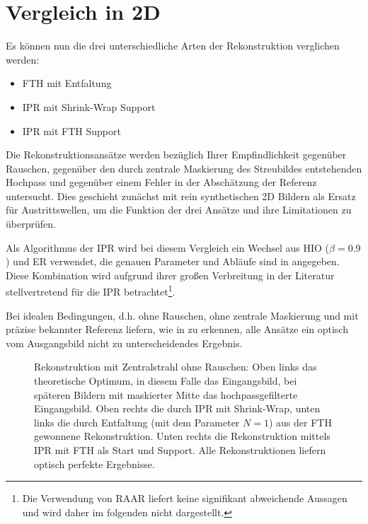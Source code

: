 \section{Vergleich in 2D}	
Es können nun die drei unterschiedliche Arten der Rekonstruktion verglichen werden:
\begin{itemize}
	\item FTH mit Entfaltung
	\item IPR mit Shrink-Wrap Support
	\item IPR mit FTH Support
\end{itemize}
Die Rekonstruktionsansätze werden bezüglich Ihrer Empfindlichkeit gegenüber Rauschen, gegenüber den durch zentrale Maskierung des Streubildes entstehenden Hochpass und gegenüber einem Fehler in der Abschätzung der Referenz untersucht. Dies geschieht zunächst mit rein synthetischen 2D Bildern als Ersatz für Austrittswellen, um die Funktion der drei Ansätze und ihre Limitationen zu überprüfen.

Als Algorithmus der IPR wird bei diesem Vergleich ein Wechsel aus HIO ($\beta=0.9$) und ER verwendet, die genauen Parameter und Abläufe sind in  angegeben. Diese Kombination wird aufgrund ihrer großen Verbreitung in der Literatur stellvertretend für die IPR betrachtet\footnote{Die Verwendung von RAAR liefert keine signifikant abweichende Aussagen und wird daher im folgenden nicht dargestellt.}. 

Bei idealen Bedingungen, d.h. ohne Rauschen, ohne zentrale Maskierung und mit präzise bekannter Referenz liefern, wie in  zu erkennen, alle Ansätze ein optisch vom Ausgangsbild nicht zu unterscheidendes Ergebnis.

\begin{figure}
	\centering
	\caption[2D Rekonstruktion: Ideal]{Rekonstruktion mit Zentralstrahl ohne Rauschen: Oben links das theoretische Optimum, in diesem Falle das Eingangsbild, bei späteren Bildern mit maskierter Mitte das hochpassgefilterte Eingangsbild. Oben rechts die durch IPR mit Shrink-Wrap, unten links die durch Entfaltung (mit dem Parameter $N=1$) aus der FTH gewonnene Rekonstruktion. Unten rechts die Rekonstruktion mittels IPR mit FTH als Start und Support. Alle Rekonstruktionen liefern optisch perfekte Ergebnisse. }
	\label{fig:recon2d-perfect}
\end{figure}

